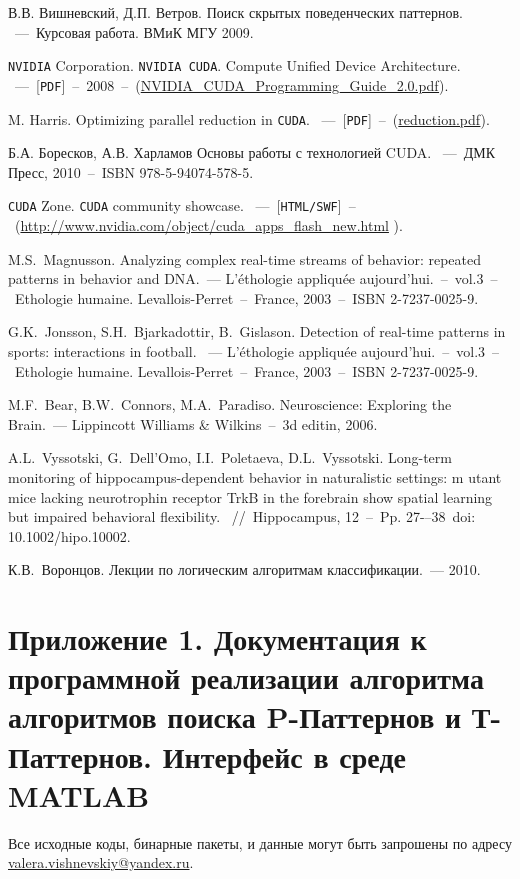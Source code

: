 \documentclass[12pt,fсeqn]{article}
\begin{document}
\begin{thebibliography}{00}
В.В. Вишневский, Д.П. Ветров.
Поиск скрытых поведенческих паттернов.
~---~Курсовая работа. ВМиК МГУ 2009.

\verb!NVIDIA! Corporation.
\verb!NVIDIA CUDA!. Compute Unified Device Architecture.
~---~[\verb!PDF!]~--~2008~--~(\href{http://developer.download.nvidia.com/compute/cuda/2_0/docs/NVIDIA_CUDA_Programming_Guide_2.0.pdf}{NVIDIA\_CUDA\_Programming\_Guide\_2.0.pdf}).

M. Harris.
Optimizing parallel reduction in \verb!CUDA!.
~---~[\verb!PDF!]~--~(\href{http://developer.download.nvidia.com/compute/cuda/1_1/Website/projects/reduction/doc/reduction.pdf}{reduction.pdf}).


Б.А. Боресков, А.В. Харламов
Основы работы с технологией CUDA.
~---~ДМК Пресс, 2010~--~ISBN 978-5-94074-578-5.

\verb!CUDA! Zone.
\verb!CUDA! community showcase.
~---~[\verb!HTML/SWF!]~--~(\url{http://www.nvidia.com/object/cuda_apps_flash_new.html} ).

M.S.~Magnusson. Analyzing complex real-time streams of behavior:
repeated patterns in behavior and DNA.~--- L'éthologie appliquée aujourd'hui.~--~vol.3~--~Ethologie humaine. Levallois-Perret~--~France, 2003~--~ISBN 2-7237-0025-9.

G.K.~Jonsson, S.H.~Bjarkadottir, B.~Gislason. 
Detection of real-time patterns in sports: interactions in football.
~--- L'éthologie appliquée aujourd'hui.~--~vol.3~--~Ethologie humaine. Levallois-Perret~--~France, 2003~--~ISBN 2-7237-0025-9.

M.F.~Bear, B.W.~Connors, M.A.~Paradiso. Neuroscience: Exploring the Brain.~--- Lippincott Williams \& Wilkins~--~3d editin, 2006.

A.L.~Vyssotski, G.~Dell'Omo, I.I.~Poletaeva, D.L.~Vyssotski.
Long-term monitoring of hippocampus-dependent behavior in naturalistic settings: m
utant mice lacking neurotrophin receptor TrkB in the forebrain show spatial learning but impaired behavioral flexibility. 
~//~Hippocampus, 12~--~Pp. 27-–38~doi: 10.1002/hipo.10002.


К.В.~Воронцов.
Лекции по логическим алгоритмам классификации.~--- 2010.

\end{thebibliography}
\newpage

\section[Приложение 1. Документация к программной реализации методов]{Приложение 1. 
Документация к программной реализации алгоритма алгоритмов поиска P-Паттернов и Т-Паттернов. Интерфейс в среде MATLAB}
Все исходные коды, бинарные пакеты, и данные могут быть запрошены по адресу \url{valera.vishnevskiy@yandex.ru}.
\end{document}
